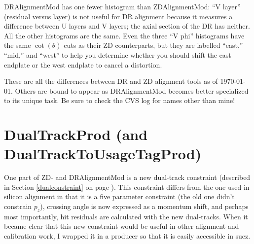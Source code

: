 \documentclass[12pt]{article}
\begin{document}
DRAlignmentMod has one fewer histogram than ZDAlignmentMod: ``V
layer'' (residual versus layer) is not useful for DR alignment because
it measures a difference between U layers and V layers; the axial
section of the DR has neither.  All the other histograms are the same.
Even the three ``V phi'' histograms have the same $\cot(\theta)$ cuts
as their ZD counterparts, but they are labelled ``east,'' ``mid,'' and
``west'' to help you determine whether you should shift the east
endplate or the west endplate to cancel a distortion.

These are all the differences between DR and ZD alignment tools as of
\today.  Others are bound to appear as DRAlignmentMod becomes better
specialized to its unique task.  Be sure to check the CVS log for
names other than mine!

\section{DualTrackProd {\normalsize (and DualTrackToUsageTagProd)}}
\label{dualtrackprod}

One part of ZD- and DRAlignmentMod is a new dual-track constraint
(described in Section \ref{dualconstraint} on page
\pageref{dualconstraint}).  This constraint differs from the one used
in silicon alignment in that it is a five parameter constraint (the
old one didn't constrain $p_z$), crossing angle is now expressed as a
momentum shift, and perhaps most importantly, hit residuals are
calculated with the new dual-tracks.  When it became clear that this
new constraint would be useful in other alignment and calibration
work, I wrapped it in a producer so that it is easily accessible in
suez.
\end{document}
